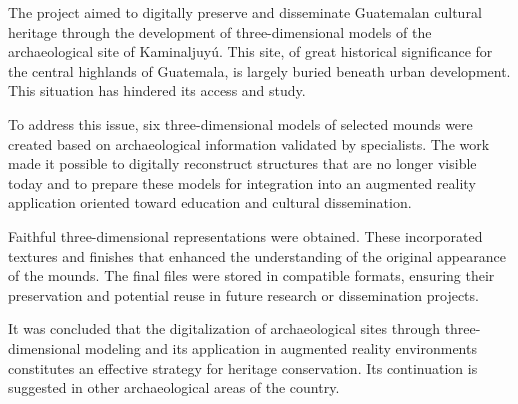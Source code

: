 
The project aimed to digitally preserve and disseminate Guatemalan cultural heritage through the development of three-dimensional models of the archaeological site of Kaminaljuyú. This site, of great historical significance for the central highlands of Guatemala, is largely buried beneath urban development. This situation has hindered its access and study.

To address this issue, six three-dimensional models of selected mounds were created based on archaeological information validated by specialists. The work made it possible to digitally reconstruct structures that are no longer visible today and to prepare these models for integration into an augmented reality application oriented toward education and cultural dissemination.

Faithful three-dimensional representations were obtained. These incorporated textures and finishes that enhanced the understanding of the original appearance of the mounds. The final files were stored in compatible formats, ensuring their preservation and potential reuse in future research or dissemination projects.

It was concluded that the digitalization of archaeological sites through three-dimensional modeling and its application in augmented reality environments constitutes an effective strategy for heritage conservation. Its continuation is suggested in other archaeological areas of the country.